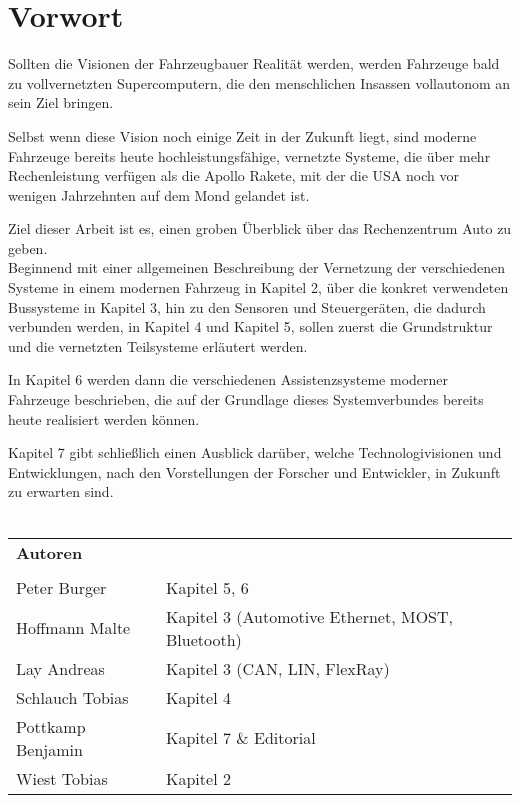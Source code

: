 \section{Vorwort}

Sollten die Visionen der Fahrzeugbauer Realität werden, werden Fahrzeuge bald zu vollvernetzten Supercomputern, die
den menschlichen Insassen vollautonom an sein Ziel bringen.

Selbst wenn diese Vision noch einige Zeit in der Zukunft liegt, sind moderne Fahrzeuge bereits heute
hochleistungsfähige, vernetzte Systeme, die über mehr Rechenleistung verfügen als die Apollo Rakete, mit der die USA noch
vor wenigen Jahrzehnten auf dem Mond gelandet ist.

Ziel dieser Arbeit ist es, einen groben Überblick über das Rechenzentrum Auto zu geben.\\

Beginnend mit einer allgemeinen Beschreibung der Vernetzung der verschiedenen Systeme in einem modernen Fahrzeug 
in Kapitel 2, über die konkret verwendeten Bussysteme in Kapitel 3, hin
zu den Sensoren und Steuergeräten, die dadurch verbunden werden, in Kapitel 4 und Kapitel 5, sollen zuerst die Grundstruktur und die vernetzten Teilsysteme
erläutert werden.

In Kapitel 6 werden dann die verschiedenen Assistenzsysteme moderner Fahrzeuge beschrieben, die auf der Grundlage dieses Systemverbundes bereits heute
realisiert werden können.

Kapitel 7 gibt schließlich einen Ausblick darüber, welche Technologivisionen und Entwicklungen, nach den Vorstellungen der Forscher und Entwickler, in Zukunft zu erwarten sind.\\\\

\begin{center}
    \begin{tabular}{l l}
        \textbf{Autoren} &\\\\
        Peter Burger & Kapitel 5, 6\\
        Hoffmann Malte & Kapitel 3 (Automotive Ethernet, MOST, Bluetooth)\\
        Lay Andreas & Kapitel 3 (CAN, LIN, FlexRay)\\
        Schlauch Tobias & Kapitel 4\\
        Pottkamp Benjamin & Kapitel 7 \& Editorial\\
        Wiest Tobias & Kapitel 2
    \end{tabular}
\end{center}

